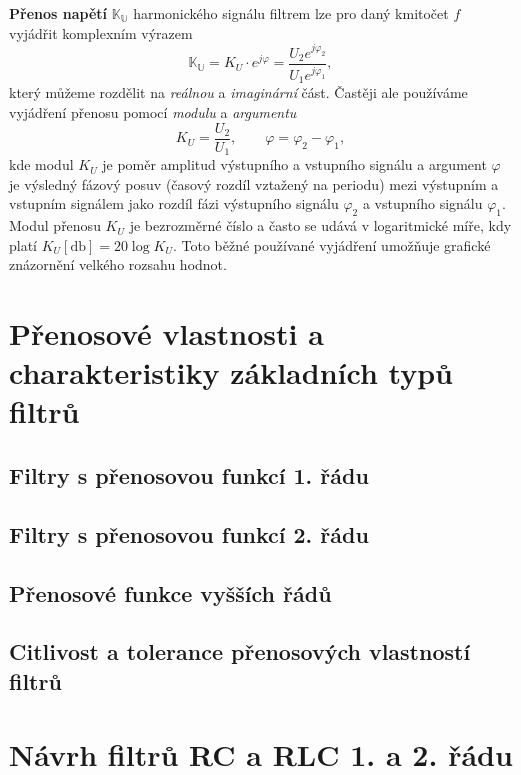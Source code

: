       \textbf{Přenos napětí} \(\mathbb{K_U}\) harmonického signálu filtrem lze pro daný kmitočet
      \(f\) vyjádřit komplexním výrazem
      \begin{equation}\label{aes:eq_KF_ku}
        \mathbb{K_U} = K_U\cdot e^{j\varphi} = \frac{U_2e^{j\varphi_2}}{U_1e^{j\varphi_1}},
      \end{equation}
      který můžeme rozdělit na \emph{reálnou} a \emph{imaginární} část. Častěji ale používáme
      vyjádření přenosu pomocí \emph{modulu} a \emph{argumentu}
      \begin{equation}\label{aes:eq_KF_moarg}
        K_U = \frac{U_2}{U_1}, \qquad \varphi = \varphi_2 - \varphi_1, 
      \end{equation}
      kde modul \(K_U\) je poměr amplitud výstupního a vstupního signálu a argument \(\varphi\) je
      výsledný fázový posuv (časový rozdíl vztažený na periodu) mezi výstupním a vstupním signálem
      jako rozdíl fázi výstupního signálu \(\varphi_2\) a vstupního signálu \(\varphi_1\). Modul
      přenosu \(K_U\) je bezrozměrné číslo a často se udává v logaritmické míře, kdy platí \(K_U
      [\si{\decibel}] = 20 \log{K_U}\). Toto běžné používané vyjádření umožňuje grafické znázornění
      velkého rozsahu hodnot.
  
  \section{Přenosové vlastnosti a charakteristiky základních typů filtrů}
    \subsection{Filtry s přenosovou funkcí 1. řádu}
    \subsection{Filtry s přenosovou funkcí 2. řádu}
    \subsection{Přenosové funkce vyšších řádů}
    \subsection{Citlivost a tolerance přenosových vlastností filtrů} 
  \section{Návrh filtrů RC a RLC 1. a 2. řádu}
